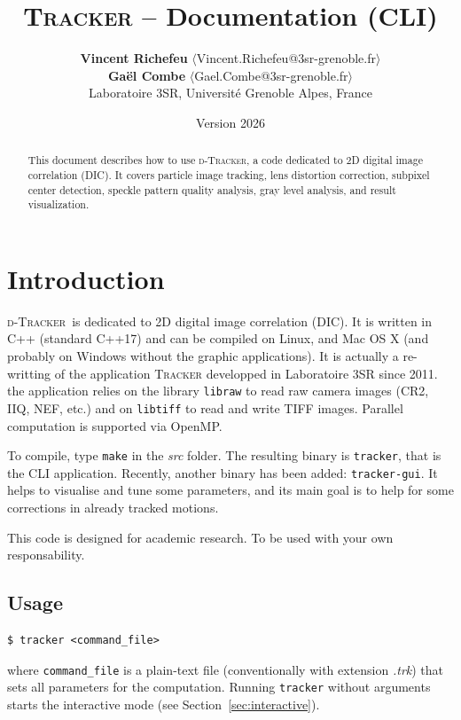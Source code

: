 \documentclass{simpledoc}
\title{\textsc{Tracker} -- Documentation (CLI)}
\author{
\textbf{Vincent Richefeu} $\langle$Vincent.Richefeu@3sr-grenoble.fr$\rangle$\\
\textbf{Ga\"{e}l Combe} $\langle$Gael.Combe@3sr-grenoble.fr$\rangle$\\
Laboratoire 3SR, Universit\'{e} Grenoble Alpes, France
}
\date{Version 2026}
\newcommand{\soft}{\textsc{d-Tracker}}
\newcommand{\file}[1]{\textit{\color{myblue}#1}}
\newcommand{\screen}[1]{\texttt{\color{myblue}#1}}
\newcommand{\scr}[1]{\texttt{\color{myblue}#1}}
\begin{document}
\maketitle

\begin{abstract}
This document describes how to use \soft, a code dedicated to 2D digital image correlation (DIC).
It covers particle image tracking, lens distortion correction, subpixel center detection, speckle
pattern quality analysis, gray level analysis, and result visualization.
\end{abstract}

\tableofcontents

\newpage

\section{Introduction}

\soft\ is dedicated to 2D digital image correlation (DIC). It is written in C++ (standard C++17)
and can be compiled on Linux, and Mac OS X (and probably on Windows without the graphic applications).
It is actually a re-writting of the application \textsc{Tracker} developped in Laboratoire 3SR since 2011.
the application relies on the library \screen{libraw} to read raw camera images (CR2, IIQ, NEF, etc.) and on
\screen{libtiff} to read and write TIFF images.
Parallel computation is supported via OpenMP.

To compile, type \screen{make} in the \file{src} folder.
The resulting binary is \screen{tracker}, that is the CLI application. Recently, another binary has been added: \screen{tracker-gui}. It helps to visualise and tune some parameters, and its main goal is to help for some corrections in already tracked motions.


\attention
{\color{red} This code is designed for academic research. To be used with your own responsability.}

\subsection{Usage}





\begin{verbatim}
$ tracker <command_file>
\end{verbatim}

where \scr{command\_file} is a plain-text file (conventionally with extension \file{.trk})
that sets all parameters for the computation.
Running \screen{tracker} without arguments starts the interactive mode (see Section~\ref{sec:interactive}).
\end{document}
